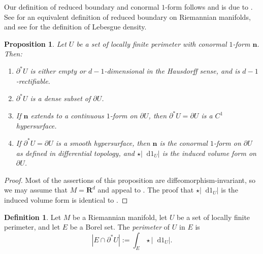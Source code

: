 \documentclass[reqno,10pt]{amsart}
\newcommand{\RR}{\mathbf{R}}
\newcommand*\dif{\mathop{}\!\mathrm{d}}
\newcommand{\normal}{\mathbf n}
\newcommand{\dfn}[1]{\emph{#1}\index{#1}}
\newtheorem{proposition}[theorem]{Proposition}
\theoremstyle{definition}
\newtheorem{definition}[theorem]{Definition}
\numberwithin{equation}{section}
\begin{document}
Our definition of reduced boundary and conormal $1$-form follows \cite[Definition 3.3]{Giusti77} and is due to \cite{deGiorgi55}.
See \cite{Battista_2021} for an equivalent definition of reduced boundary on Riemannian manifolds, and see \cite[Chapter 6]{Pugh02} for the definition of Lebesgue density.

\begin{proposition}\label{locality of Caccioppoli}
    Let $U$ be a set of locally finite perimeter with conormal $1$-form $\normal$.
    Then:
    \begin{enumerate}
    \item $\partial^* U$ is either empty or $d-1$-dimensional in the Hausdorff sense, and is $d-1$-rectifiable.
    \item $\partial^* U$ is a dense subset of $\partial U$.
    \item If $\normal$ extends to a continuous $1$-form on $\partial U$, then $\partial^* U = \partial U$ is a $C^1$ hypersurface.
    \item If $\partial^* U = \partial U$ is a smooth hypersurface, then $\normal$ is the conormal $1$-form on $\partial U$ as defined in differential topology, and $\star |\dif 1_U|$ is the induced volume form on $\partial U$.
\end{enumerate}
\end{proposition}
\begin{proof}
Most of the assertions of this proposition are diffeomorphism-invariant, so we may assume that $M = \RR^d$ and appeal to \cite[Chapters 2-4]{Giusti77}.
The proof that $\star |\dif 1_U|$ is the induced volume form is identical to \cite[Example 1.4]{Giusti77}.
\end{proof}

\begin{definition}
Let $M$ be a Riemannian manifold, let $U$ be a set of locally finite perimeter, and let $E$ be a Borel set.
The \dfn{perimeter} of $U$ in $E$ is
$$|E \cap \partial^* U| := \int_E \star |\dif 1_U|.$$
\end{definition}
\end{document}
